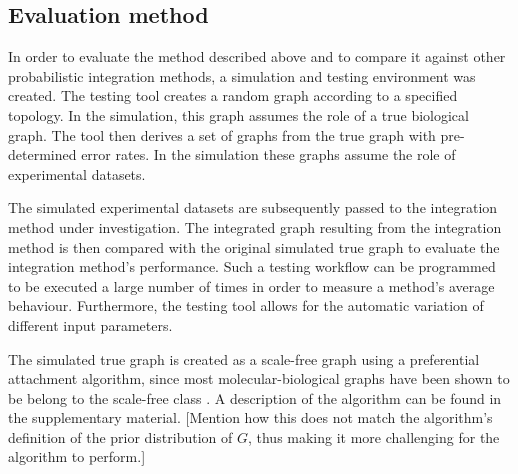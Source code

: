 \documentclass{bioinfo}
\newcommand{\prob}{\mathbb{P}}
\newcommand{\note}[1]{{\color{red}[#1]}}
\begin{document}
\begin{methods}



\subsection{Evaluation method}

In order to evaluate the method described above and to compare it against other probabilistic integration methods, a simulation and testing environment was created. The testing tool creates a random graph according to a specified topology. In the simulation, this graph assumes the role of a true biological graph. The tool then derives a set of graphs from the true graph with pre-determined error rates. In the simulation these graphs assume the role of experimental datasets. 

The simulated experimental datasets are subsequently passed to the integration method under investigation. The integrated graph resulting from the integration method is then compared with the original simulated true graph to evaluate the integration method's performance. Such a testing workflow can be programmed to be executed a large number of times in order to measure a method's average behaviour. Furthermore, the testing tool allows for the automatic variation of different input parameters.

The simulated true graph is created as a scale-free graph using a preferential attachment algorithm, since most molecular-biological graphs have been shown to be belong to the scale-free class \citep{jeong_lethality_2001, eisenberg_preferential_2003}. A description of the algorithm can be found in the supplementary material.
\note{Mention how this does not match the algorithm's definition of the prior distribution of $G$, thus making it more challenging for the algorithm to perform.}%


\end{methods}
\end{document}
